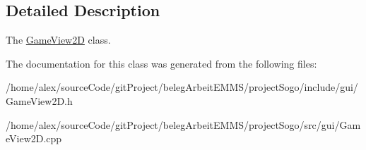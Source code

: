 \subsection{Detailed Description}
The \hyperlink{classGameView2D}{Game\-View2\-D} class. 

The documentation for this class was generated from the following files\-:\begin{DoxyCompactItemize}
\item 
/home/alex/source\-Code/git\-Project/beleg\-Arbeit\-E\-M\-M\-S/project\-Sogo/include/gui/Game\-View2\-D.\-h\item 
/home/alex/source\-Code/git\-Project/beleg\-Arbeit\-E\-M\-M\-S/project\-Sogo/src/gui/Game\-View2\-D.\-cpp\end{DoxyCompactItemize}
